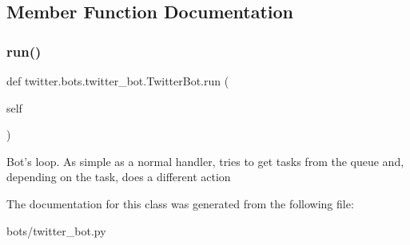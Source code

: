 \subsection{Member Function Documentation}
\mbox{\label{classtwitter_1_1bots_1_1twitter__bot_1_1TwitterBot_aa0425e1810fa53dab90ca0e9d7b973d1}} 
\subsubsection{\texorpdfstring{run()}{run()}}
{\footnotesize\ttfamily def twitter.\+bots.\+twitter\+\_\+bot.\+Twitter\+Bot.\+run (\begin{DoxyParamCaption}\item[{}]{self }\end{DoxyParamCaption})}

\begin{DoxyVerb}Bot's loop. As simple as a normal handler, tries to get tasks from the queue and, depending on the
    task, does a different action
\end{DoxyVerb}
 

The documentation for this class was generated from the following file\+:\begin{DoxyCompactItemize}
\item 
bots/twitter\+\_\+bot.\+py\end{DoxyCompactItemize}
